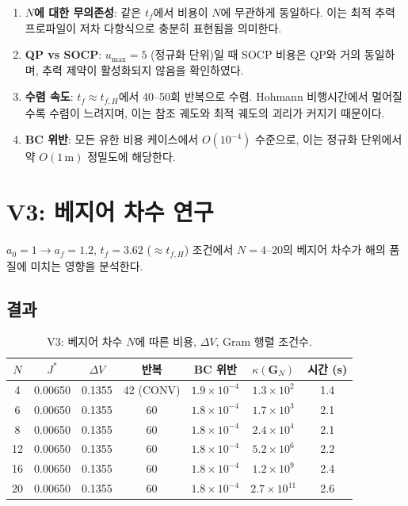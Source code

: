 \documentclass[11pt]{article}
\begin{document}
\begin{enumerate}
  \item \textbf{$N$에 대한 무의존성}: 같은 $t_f$에서 비용이 $N$에 무관하게 동일하다.
        이는 최적 추력 프로파일이 저차 다항식으로 충분히 표현됨을 의미한다.
  \item \textbf{QP vs SOCP}: $u_{\max}=5$ (정규화 단위)일 때
        SOCP 비용은 QP와 거의 동일하며, 추력 제약이 활성화되지 않음을 확인하였다.
  \item \textbf{수렴 속도}: $t_f \approx t_{f,H}$에서 40--50회 반복으로 수렴.
        Hohmann 비행시간에서 멀어질수록 수렴이 느려지며,
        이는 참조 궤도와 최적 궤도의 괴리가 커지기 때문이다.
  \item \textbf{BC 위반}: 모든 유한 비용 케이스에서 $O(10^{-4})$ 수준으로,
        이는 정규화 단위에서 약 $O(1\,\text{m})$ 정밀도에 해당한다.
\end{enumerate}

\section{V3: 베지어 차수 연구}
\label{sec:v3}

$a_0=1 \to a_f=1.2$, $t_f=3.62$ ($\approx t_{f,H}$) 조건에서
$N=4$--$20$의 베지어 차수가 해의 품질에 미치는 영향을 분석한다.

\subsection{결과}

\begin{table}[h]
\centering
\caption{V3: 베지어 차수 $N$에 따른 비용, $\Delta V$, Gram 행렬 조건수.}
\label{tab:v3}
\small
\begin{tabular}{@{}ccccccc@{}}
\toprule
$N$ & $J^*$ & $\Delta V$ & 반복 & BC 위반 & $\kappa(\mathbf{G}_N)$ & 시간 (s) \\
\midrule
4  & 0.00650 & 0.1355 & 42 (CONV) & $1.9\times 10^{-4}$ & $1.3\times 10^{2}$ & 1.4 \\
6  & 0.00650 & 0.1355 & 60 & $1.8\times 10^{-4}$ & $1.7\times 10^{3}$ & 2.1 \\
8  & 0.00650 & 0.1355 & 60 & $1.8\times 10^{-4}$ & $2.4\times 10^{4}$ & 2.1 \\
12 & 0.00650 & 0.1355 & 60 & $1.8\times 10^{-4}$ & $5.2\times 10^{6}$ & 2.2 \\
16 & 0.00650 & 0.1355 & 60 & $1.8\times 10^{-4}$ & $1.2\times 10^{9}$ & 2.4 \\
20 & 0.00650 & 0.1355 & 60 & $1.8\times 10^{-4}$ & $2.7\times 10^{11}$ & 2.6 \\
\bottomrule
\end{tabular}
\end{table}
\end{document}
